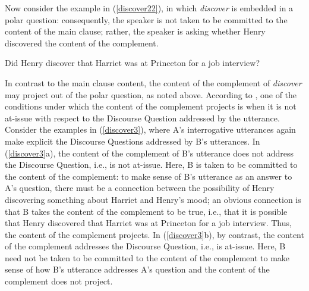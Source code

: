 \documentclass[11pt,fleqn]{article}
\newcommand{\6}{\mbox{$[\hspace*{-.6mm}[$}}
\newcommand{\9}{\mbox{$]\hspace*{-.6mm}]$}}
\begin{document}
Now consider the example in (\ref{discover22}), in which  {\em discover} is embedded in a polar question: consequently, the speaker is not taken to be committed to the content of the main clause; rather, the speaker is asking whether Henry discovered the content of the complement.

\begin{exe}
\ex\label{discover22} Did Henry discover that Harriet was at Princeton for a job interview?
\end{exe}
In contrast to the main clause content, the content of the complement of {\em discover} may project out of the polar question, as noted above. According to \citealt{best-question}, one of the conditions under which the content of the complement projects is when it is not at-issue with respect to the Discourse Question addressed by the utterance. Consider the examples in (\ref{discover3}), where A's interrogative utterances again make explicit the Discourse Questions addressed by B's utterances. In (\ref{discover3}a), the content of the complement of B's utterance does not address the Discourse Question, i.e., is not at-issue. Here, B is taken to be committed to the content of the complement: to make sense of B's utterance as an answer to A's question, there must be a connection between the possibility of Henry discovering something about Harriet and Henry's mood; an obvious connection is that B takes the content of the complement to be true, i.e., that it is possible that Henry discovered that Harriet was at Princeton for a job interview. Thus, the content of the complement projects. In (\ref{discover3}b), by contrast, the content of the complement addresses the Discourse Question, i.e., is at-issue. Here, B need not be taken to be committed to the content of the complement to make sense of how B's utterance addresses A's question and the content of the complement does not project.
\end{document}
